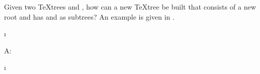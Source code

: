 Given two \TeX{}trees  and ,                                      
how can a new \TeX{}tree  be built that                                  
consists of a new root and has  and  as subtrees?                 
An example is given in .                        
                                                                                
\begin{Figure}                                                                  
\centering                                                                      
\begin{Tree}                                                                    
\e\ir\ir\e                                                                      
  \i %
\end{Tree}                                                                      
\leavevmode                                                                     
A: %
\hspace{1em}%
\hspace{\leftdist}\usebox{\TeXTree}\hspace{\rightdist}%
\hspace{1em}%
%                               
\qquad                                                                          
\begin{Tree}                                                                    
\e\il\e\i\il\il\ir %
\end{Tree}                                                                      

\end{Figure}

